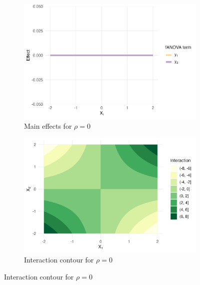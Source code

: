 \begin{figure}[htpb]
    \vspace{0.5em}
    \begin{subfigure}[t]{0.49\textwidth}
        \centering
        \includegraphics[width=\textwidth]{images/experiment_section/interaction_a1p00_a2p00_a11p00_a22p00_a12p20_rhop00_main.png}
        \caption{Main effects for $\rho = 0$}
    \end{subfigure}%
    \hfill
    \begin{subfigure}[t]{0.49\textwidth}
        \centering
        \includegraphics[width=\textwidth]{images/experiment_section/interaction_a1p00_a2p00_a11p00_a22p00_a12p20_rhop00_interaction.png}
        \caption{Interaction contour for $\rho = 0$}
    \end{subfigure}


\end{figure}
